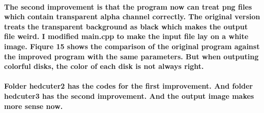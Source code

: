 \documentclass[11pt]{article}
\begin{document}
\paragraph{The second improvement is that the program now can treat png files which contain transparent alpha channel correctly. The original version treats the transparent background as black which makes the output file weird. I modified main.cpp to make the input file lay on a white image. Fiqure 15 shows the comparison of the original program against the improved program with the same parameters. But when outputing colorful disks, the color of each disk is not always right. }
 \paragraph{Folder hedcuter2 has the codes for the first improvement. And folder hedcuter3 has the second improvement. And the output image makes more sense now.}


\end{document}
